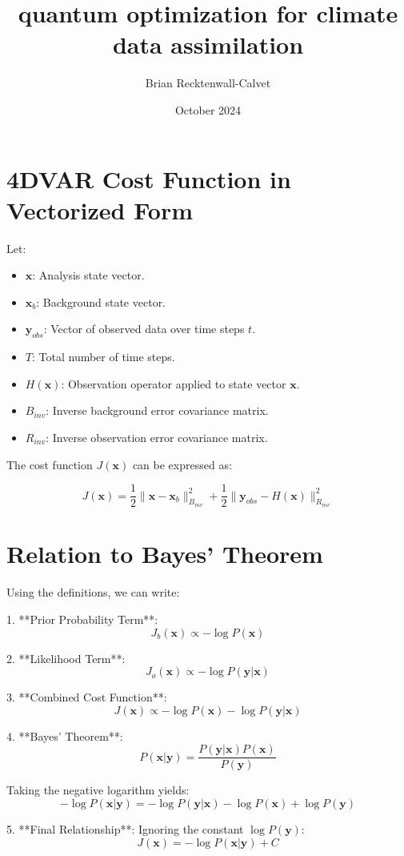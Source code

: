 \documentclass{article}
\title{quantum optimization for climate data assimilation}
\author{Brian Recktenwall-Calvet}
\date{October 2024}
\begin{document}
\maketitle

\section{4DVAR Cost Function in Vectorized Form}

Let:
\begin{itemize}
    \item \( \mathbf{x} \): Analysis state vector.
    \item \( \mathbf{x}_b \): Background state vector.
    \item \( \mathbf{y}_{obs} \): Vector of observed data over time steps \( t \).
    \item \( T \): Total number of time steps.
    \item \( H(\mathbf{x}) \): Observation operator applied to state vector \( \mathbf{x} \).
    \item \( B_{inv} \): Inverse background error covariance matrix.
    \item \( R_{inv} \): Inverse observation error covariance matrix.
\end{itemize}

The cost function \( J(\mathbf{x}) \) can be expressed as:

\[
J(\mathbf{x}) = \frac{1}{2} \|\mathbf{x} - \mathbf{x}_b\|_{B_{inv}}^2 + \frac{1}{2} \|\mathbf{y}_{obs} - H(\mathbf{x})\|_{R_{inv}}^2
\]

\section{Relation to Bayes' Theorem}

Using the definitions, we can write:

1. **Prior Probability Term**:
   \[
   J_b(\mathbf{x}) \propto -\log P(\mathbf{x})
   \]

2. **Likelihood Term**:
   \[
   J_o(\mathbf{x}) \propto -\log P(\mathbf{y} | \mathbf{x})
   \]

3. **Combined Cost Function**:
   \[
   J(\mathbf{x}) \propto -\log P(\mathbf{x}) - \log P(\mathbf{y} | \mathbf{x})
   \]

4. **Bayes' Theorem**:
   \[
   P(\mathbf{x} | \mathbf{y}) = \frac{P(\mathbf{y} | \mathbf{x}) P(\mathbf{x})}{P(\mathbf{y})}
   \]

   Taking the negative logarithm yields:
   \[
   -\log P(\mathbf{x} | \mathbf{y}) = -\log P(\mathbf{y} | \mathbf{x}) - \log P(\mathbf{x}) + \log P(\mathbf{y})
   \]

5. **Final Relationship**:
   Ignoring the constant \( \log P(\mathbf{y}) \):
   \[
   J(\mathbf{x}) = -\log P(\mathbf{x} | \mathbf{y}) + C
   \]
\end{document}
